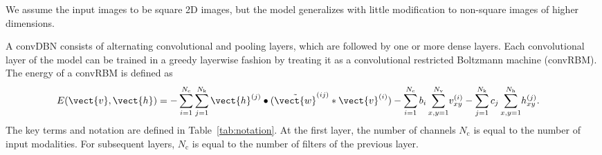 We assume the input images to be square 2D images, but the model generalizes
with little modification to non-square images of higher dimensions.

A convDBN consists of alternating convolutional and pooling layers, which are
followed by one or more dense layers. Each convolutional layer of the model can
be trained in a greedy layerwise fashion by treating it as a convolutional
restricted Boltzmann machine (convRBM). The energy of a convRBM is defined as
\begin{align} 
E(\vect{v},\vect{h}) 
&= -\sum_{i=1}^{N_\text{c}} \sum_{j=1}^{N_\text{k}} \vect{h}^{(j)}
\bullet (\tilde{\vect{w}}^{(ij)} * \vect{v}^{(i)}) -
\sum_{i=1}^{N_\text{c}}b_i\sum_{x,y = 1}^{N_\text{v}}\!v_{xy}^{(i)} -
\sum_{j=1}^{N_\text{k}}c_j\sum_{x,y = 1}^{N_\text{h}}\!h_{xy}^{(j)}.
\end{align}
The key terms and notation are defined in Table~\ref{tab:notation}. At the first
layer, the number of channels $N_\text{c}$ is equal to the number of input
modalities. For subsequent layers, $N_\text{c}$ is equal to the number of
filters of the previous layer.

